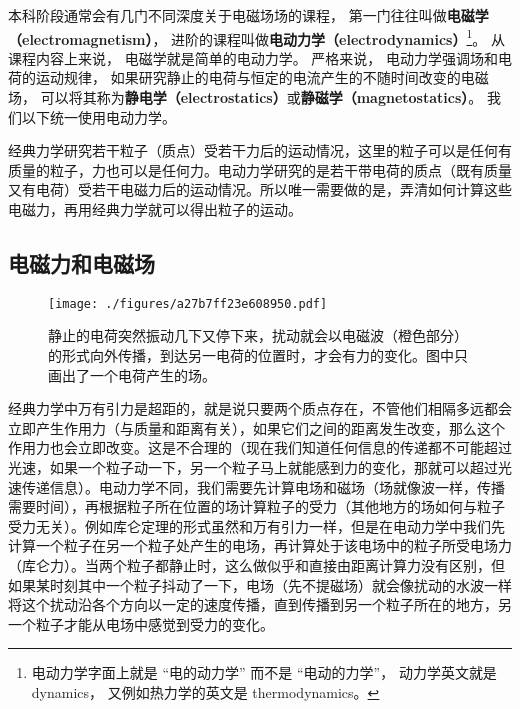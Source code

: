
\begin{issues}
\issueTODO
\end{issues}


本科阶段通常会有几门不同深度关于电磁场场的课程， 第一门往往叫做\textbf{电磁学（electromagnetism）}， 进阶的课程叫做\textbf{电动力学（electrodynamics）}\footnote{电动力学字面上就是 “电的动力学” 而不是 “电动的力学”， 动力学英文就是 dynamics， 又例如热力学的英文是 thermodynamics。}。 从课程内容上来说， 电磁学就是简单的电动力学。 严格来说， 电动力学强调场和电荷的运动规律， 如果研究静止的电荷与恒定的电流产生的不随时间改变的电磁场， 可以将其称为\textbf{静电学（electrostatics）}或\textbf{静磁学（magnetostatics）}。 我们以下统一使用电动力学。

经典力学研究若干粒子（质点）受若干力后的运动情况，这里的粒子可以是任何有质量的粒子，力也可以是任何力。电动力学研究的是若干带电荷的质点（既有质量又有电荷）受若干电磁力后的运动情况。所以唯一需要做的是，弄清如何计算这些电磁力，再用经典力学就可以得出粒子的运动。

\subsection{电磁力和电磁场}

\begin{figure}[ht]
\centering
\texttt{[image: ./figures/a27b7ff23e608950.pdf]}
\caption{静止的电荷突然振动几下又停下来，扰动就会以电磁波（橙色部分）的形式向外传播，到达另一电荷的位置时，才会有力的变化。图中只画出了一个电荷产生的场。} \label{fig_EM0_1}
\end{figure}

经典力学中万有引力是超距的，就是说只要两个质点存在，不管他们相隔多远都会立即产生作用力（与质量和距离有关），如果它们之间的距离发生改变，那么这个作用力也会立即改变。这是不合理的（现在我们知道任何信息的传递都不可能超过光速，如果一个粒子动一下，另一个粒子马上就能感到力的变化，那就可以超过光速传递信息）。电动力学不同，我们需要先计算电场和磁场（场就像波一样，传播需要时间），再根据粒子所在位置的场计算粒子的受力（其他地方的场如何与粒子受力无关）。例如库仑定理的形式虽然和万有引力一样，但是在电动力学中我们先计算一个粒子在另一个粒子处产生的电场，再计算处于该电场中的粒子所受电场力（库仑力）。当两个粒子都静止时，这么做似乎和直接由距离计算力没有区别，但如果某时刻其中一个粒子抖动了一下，电场（先不提磁场）就会像扰动的水波一样将这个扰动沿各个方向以一定的速度传播，直到传播到另一个粒子所在的地方，另一个粒子才能从电场中感觉到受力的变化。

